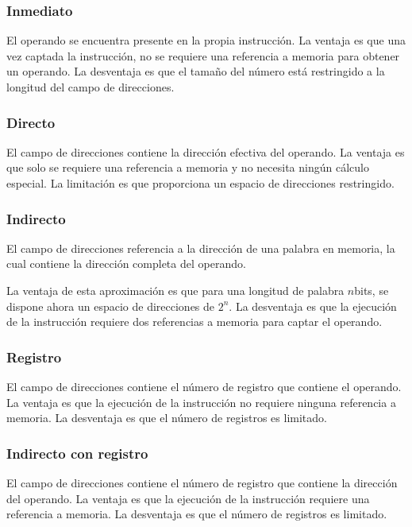 \begin{subs}
  \subsubsection{Inmediato}
  El operando se encuentra presente en la propia instrucción. La ventaja es que una vez captada la instrucción, no se requiere una referencia a memoria para obtener un operando. La desventaja es que el tamaño del número está restringido a la longitud del campo de direcciones.

  \subsubsection{Directo}

  El campo de direcciones contiene la dirección efectiva del operando. La ventaja es que solo se requiere una referencia a memoria y no necesita ningún cálculo especial. La limitación es que proporciona un espacio de direcciones restringido.

  \subsubsection{Indirecto}

  El campo de direcciones referencia a la dirección de una palabra en memoria, la cual contiene la dirección completa del operando.

  La ventaja de esta aproximación es que para una longitud de palabra $n$bits, se dispone ahora un espacio de direcciones de $2^n$. La desventaja es que la ejecución de la instrucción requiere dos referencias a memoria para captar el operando.

  \subsubsection{Registro}

  El campo de direcciones contiene el número de registro que contiene el operando. La ventaja es que la ejecución de la instrucción no requiere ninguna referencia a memoria. La desventaja es que el número de registros es limitado.

  \subsubsection{Indirecto con registro}

  El campo de direcciones contiene el número de registro que contiene la dirección del operando. La ventaja es que la ejecución de la instrucción requiere una referencia a memoria. La desventaja es que el número de registros es limitado.


\end{subs}
